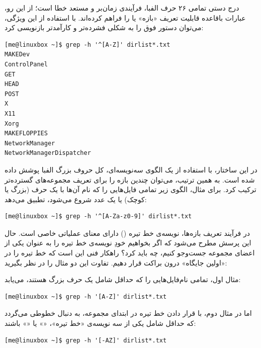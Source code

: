 درج دستی تمامی ۲۶ حرف الفبا، فرآیندی زمان‌بر و مستعد خطا است؛ از این رو، عبارات باقاعده قابلیت تعریف «بازه» یا  را فراهم کرده‌اند. با استفاده از این ویژگی، می‌توان دستور فوق را به شکلی فشرده‌تر و کارآمدتر بازنویسی کرد:

\begin{latin}
\begin{lstlisting}
[me@linuxbox ~]$ grep -h '^[A-Z]' dirlist*.txt
MAKEDev
ControlPanel
GET
HEAD
POST
X
X11
Xorg
MAKEFLOPPIES
NetworkManager
NetworkManagerDispatcher
\end{lstlisting}
\end{latin}

در این ساختار، با استفاده از یک الگوی سه‌نویسه‌ای، کل حروف بزرگ الفبا پوشش داده شده است. به همین ترتیب، می‌توان چندین بازه را برای تعریف مجموعه‌های گسترده‌تر ترکیب کرد. برای مثال، الگوی زیر تمامی فایل‌هایی را که نام آن‌ها با یک حرف (بزرگ یا کوچک) یا یک عدد شروع می‌شود، تطبیق می‌دهد:

\begin{latin}
\begin{lstlisting}
[me@linuxbox ~]$ grep -h '^[A-Za-z0-9]' dirlist*.txt
\end{lstlisting}
\end{latin}

در فرآیند تعریف بازه‌ها، نویسه‌ی خط تیره (\cmd{-}) دارای معنای عملیاتی خاصی است. حال این پرسش مطرح می‌شود که اگر بخواهیم خودِ نویسه‌ی خط تیره را به عنوان یکی از اعضای مجموعه جست‌وجو کنیم، چه باید کرد؟ راهکار فنی این است که خط تیره را در «اولین جایگاه» درون براکت قرار دهیم. تفاوت این دو مثال را در نظر بگیرید:

مثال اول، تمامی نام‌فایل‌هایی را که حداقل شامل یک حرف بزرگ هستند، می‌یابد:

\begin{latin}
\begin{lstlisting}
[me@linuxbox ~]$ grep -h '[A-Z]' dirlist*.txt
\end{lstlisting}
\end{latin}

اما در مثال دوم، با قرار دادن خط تیره در ابتدای مجموعه،  به دنبال خطوطی می‌گردد که حداقل شامل یکی از سه نویسه‌ی «خط تیره»، «» یا «» باشند:

\begin{latin}
\begin{lstlisting}
[me@linuxbox ~]$ grep -h '[-AZ]' dirlist*.txt
\end{lstlisting}
\end{latin}

